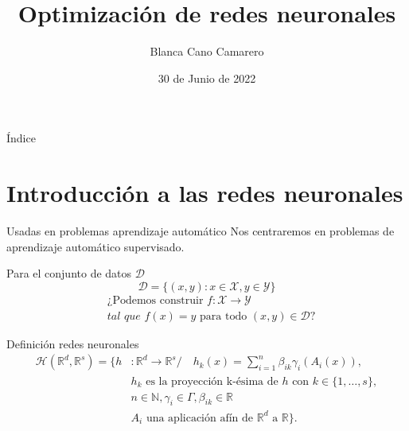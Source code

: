 \documentclass{beamer}
\title{Optimización de redes neuronales}
\author{Blanca Cano Camarero}
\date{30 de Junio de 2022}
\newcommand{\R}{\mathbb{R}}
\newcommand{\N}{\mathbb{N}}
\begin{document}
\begin{frame}
    \titlepage 
\end{frame}


\begin{frame}{Índice}
    \tableofcontents
\end{frame}
\section{Introducción a las redes neuronales}
\begin{frame}{Usadas en problemas aprendizaje automático}
    Nos centraremos en problemas de aprendizaje automático supervisado. 

    Para el conjunto de datos  $\mathcal{D}$
    \begin{equation*}
        \mathcal{D} = \{(x,y) : x \in \mathcal{X}, y \in \mathcal{Y}\}
    \end{equation*}
    \begin{align*}
        &\text{¿Podemos construir } f: \mathcal{X} \longrightarrow \mathcal{Y} \\
        &\textit{tal que } f(x) = y \text{ para todo } (x,y) \in \mathcal{D} \text{?}
    \end{align*} 
\end{frame}
\begin{frame}{Definición redes neuronales}
    \begin{align*}
        \mathcal{H}(\R^d,\R^s) 
            =
            \{
                h &: \R^d \longrightarrow \R^s 
                 /\quad 
                h_k(x) = 
                \sum_{i=1}^{n} \beta_{i k} \gamma_{i}( A_{i}(x)), \\
                & \text{$h_k$  es la proyección k-ésima de $h$ con 
                $k \in \{1, \ldots, s\}$}, \\
                & n \in \N,\gamma_{i} \in \Gamma , \beta_{i k} \in \R \\
                &A_{i} \text{ una aplicación afín de $\R^d$ a $\R$}           
            \}.
    \end{align*}
\end{frame}
\end{document}
